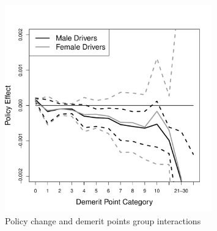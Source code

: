 \documentclass[11pt]{paper}
\begin{document}
\begin{figure}
\centering
\includegraphics[width=0.8\textwidth]{../Figures/FFX_reg_policy_points_grp.pdf}
\caption{Policy change and demerit points group interactions}
% 
\label{fig:FE-regs}
\end{figure}



\end{document}
